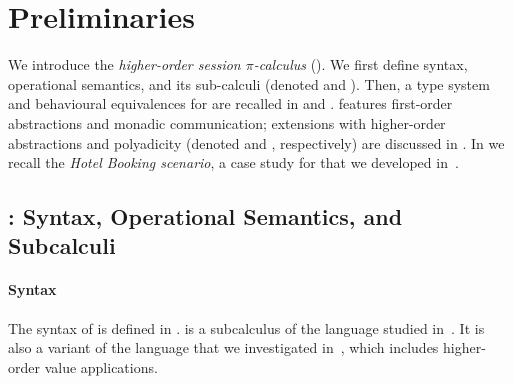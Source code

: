 \documentclass[preprint,11pt]{elsarticle}
\begin{document}
{%

\section{Preliminaries}
\label{sec:prelim}

We introduce 
the \emph{higher-order session $\pi$-calculus} (\HOp).
We first define 
syntax, operational semantics, and 
its sub-calculi (denoted \sessp and \HO).
Then, a type system and behavioural equivalences for \HOp are recalled in 
 and . 
\HOp features first-order abstractions and monadic communication; extensions 
with higher-order abstractions and polyadicity (denoted \HOpp and \PHOp, respectively) 
are discussed in .
In  we recall the \emph{Hotel Booking scenario}, a case study for \HOp that we developed in~\cite{characteristic_bis,KouzapasPY17}.




\subsection{\HOp: Syntax, Operational Semantics, and Subcalculi}
\label{subsec:syntax}

\paragraph{Syntax}
The syntax of \HOp is defined in .
\HOp  is a subcalculus of the language studied 
in~\cite{tlca07}. It is also a variant of the language that we investigated in~\cite{characteristic_bis}, 
which includes higher-order value applications. 




}
\end{document}
